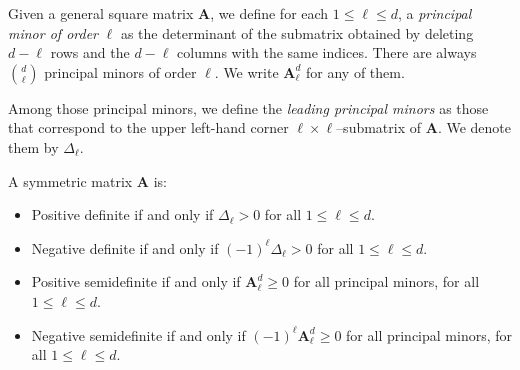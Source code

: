 \begin{definition}
Given a general square matrix $\boldsymbol{A}$, we define for each $1 \leq \ell \leq d$, a \emph{principal minor of order }$\ell$ as the determinant of the submatrix obtained by deleting $d-\ell$ rows and the $d-\ell$ columns with the same indices.  There are always $\binom{d}{\ell}$ principal minors of order $\ell$.  We write $\boldsymbol{A}_\ell^d$ for any of them.

Among those principal minors, we define the \emph{leading principal minors} as those that correspond to the upper left-hand corner $\ell \times \ell$--submatrix of $\boldsymbol{A}$.  We denote them by $\Delta_\ell$.
\begin{center}
\end{center}
\end{definition}

\begin{theorem}\label{theorem:PrincipalMinors}
A symmetric matrix $\boldsymbol{A}$ is:
\begin{itemize}
\item Positive definite if and only if $\Delta_\ell > 0$ for all $1\leq \ell \leq d$.
\item Negative definite if and only if $(-1)^\ell \Delta_\ell>0$ for all $1\leq \ell \leq d$.
\item Positive semidefinite if and only if $\boldsymbol{A}_\ell^d \geq 0$ for all principal minors, for all $1 \leq \ell \leq d$.
\item Negative semidefinite if and only if $(-1)^\ell \boldsymbol{A}_\ell^d \geq 0$ for all principal minors, for all $1 \leq \ell \leq d$.
\end{itemize}
\end{theorem}


